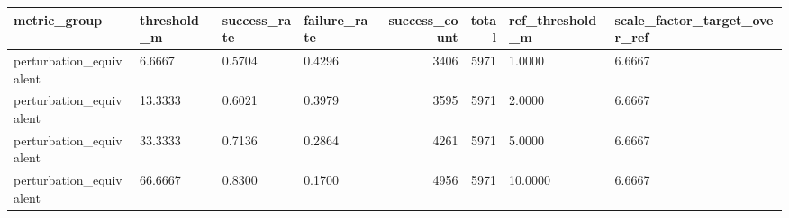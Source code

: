 \begin{tabular}{llllrrll}
\toprule
metric_group & threshold_m & success_rate & failure_rate & success_count & total & ref_threshold_m & scale_factor_target_over_ref \\
\midrule
perturbation_equivalent & 6.6667 & 0.5704 & 0.4296 & 3406 & 5971 & 1.0000 & 6.6667 \\
perturbation_equivalent & 13.3333 & 0.6021 & 0.3979 & 3595 & 5971 & 2.0000 & 6.6667 \\
perturbation_equivalent & 33.3333 & 0.7136 & 0.2864 & 4261 & 5971 & 5.0000 & 6.6667 \\
perturbation_equivalent & 66.6667 & 0.8300 & 0.1700 & 4956 & 5971 & 10.0000 & 6.6667 \\
\bottomrule
\end{tabular}
